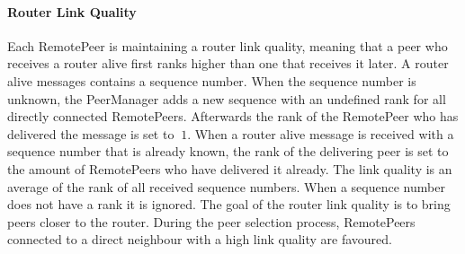 \paragraph{Router Link Quality}
Each RemotePeer is maintaining a router link quality, meaning that a peer who receives a router alive first ranks higher than one that receives it later. A router alive messages contains a sequence number. When the sequence number is unknown, the PeerManager adds a new sequence with an undefined rank for all directly connected RemotePeers. Afterwards the rank of the RemotePeer who has delivered the message is set to $\ 1 $.
When a router alive message is received with a sequence number that is already known, the rank of the delivering peer is set to the amount of RemotePeers who have delivered it already.
The link quality is an average of the rank of all received sequence numbers. When a sequence number does not have a rank it is ignored.
The goal of the router link quality is to bring peers closer to the router. During the peer selection process, RemotePeers connected to a direct neighbour with a high link quality are favoured.

